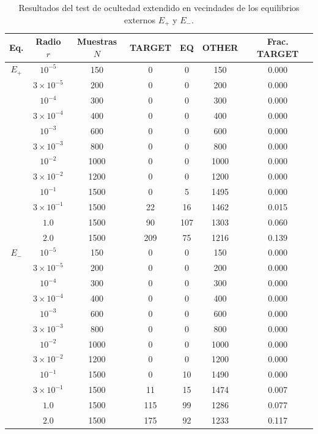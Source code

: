 \documentclass[journal]{IEEEtran}
\begin{document}
\begin{table}[H]
\centering
\scriptsize
\caption{Resultados del test de ocultedad extendido en vecindades de los equilibrios externos $E_+$ y $E_-$.}
\label{tab:chua_frac_ns_biased_extended_hiddenness}
\begin{tabular}{ccccccc}
\toprule
\textbf{Eq.} & \textbf{Radio} $r$ & \textbf{Muestras} $N$ & \textbf{TARGET} & \textbf{EQ} & \textbf{OTHER} & \textbf{Frac. TARGET} \\
\midrule
$E_+$ & $10^{-5}$ & 150 & 0 & 0 & 150 & 0.000 \\
      & $3{\times}10^{-5}$ & 200 & 0 & 0 & 200 & 0.000 \\
      & $10^{-4}$ & 300 & 0 & 0 & 300 & 0.000 \\
      & $3{\times}10^{-4}$ & 400 & 0 & 0 & 400 & 0.000 \\
      & $10^{-3}$ & 600 & 0 & 0 & 600 & 0.000 \\
      & $3{\times}10^{-3}$ & 800 & 0 & 0 & 800 & 0.000 \\
      & $10^{-2}$ & 1000 & 0 & 0 & 1000 & 0.000 \\
      & $3{\times}10^{-2}$ & 1200 & 0 & 0 & 1200 & 0.000 \\
      & $10^{-1}$ & 1500 & 0 & 5 & 1495 & 0.000 \\
      & $3{\times}10^{-1}$ & 1500 & 22 & 16 & 1462 & 0.015 \\
      & $1.0$ & 1500 & 90 & 107 & 1303 & 0.060 \\
      & $2.0$ & 1500 & 209 & 75 & 1216 & 0.139 \\
\midrule
$E_-$ & $10^{-5}$ & 150 & 0 & 0 & 150 & 0.000 \\
      & $3{\times}10^{-5}$ & 200 & 0 & 0 & 200 & 0.000 \\
      & $10^{-4}$ & 300 & 0 & 0 & 300 & 0.000 \\
      & $3{\times}10^{-4}$ & 400 & 0 & 0 & 400 & 0.000 \\
      & $10^{-3}$ & 600 & 0 & 0 & 600 & 0.000 \\
      & $3{\times}10^{-3}$ & 800 & 0 & 0 & 800 & 0.000 \\
      & $10^{-2}$ & 1000 & 0 & 0 & 1000 & 0.000 \\
      & $3{\times}10^{-2}$ & 1200 & 0 & 0 & 1200 & 0.000 \\
      & $10^{-1}$ & 1500 & 0 & 10 & 1490 & 0.000 \\
      & $3{\times}10^{-1}$ & 1500 & 11 & 15 & 1474 & 0.007 \\
      & $1.0$ & 1500 & 115 & 99 & 1286 & 0.077 \\
      & $2.0$ & 1500 & 175 & 92 & 1233 & 0.117 \\
\bottomrule
\end{tabular}
\end{table}
\end{document}
